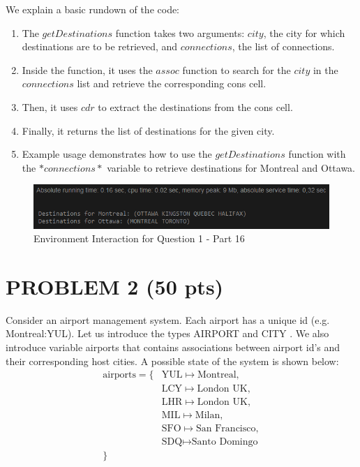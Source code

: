 \documentclass[12pt]{article}
\begin{document}
\begin{spacing}{1.5}
\begin{enumerate}
		      
		      
		      We explain a basic rundown of the code:
		      \begin{enumerate}
		      	\item The $getDestinations$ function takes two arguments: $city$, the city for which destinations are to be retrieved, and $connections$, the list of connections.
		      	\item Inside the function, it uses the $assoc$ function to search for the $city$ in the $connections$ list and retrieve the corresponding cons cell.
		      	\item Then, it uses $cdr$ to extract the destinations from the cons cell.
		      	\item Finally, it returns the list of destinations for the given city.
		      	\item Example usage demonstrates how to use the $getDestinations$ function with the $*connections*$ variable to retrieve destinations for Montreal and Ottawa.
		      \end{enumerate}
		      
		      \begin{figure}[htp]
		      	\centering
		      	\includegraphics[width=1\textwidth]{static/getDestinations-1-16.PNG}
		      	\caption{Environment Interaction for Question 1 - Part 16}
		      	\label{fig:figure}
		      \end{figure}
		      		           
	\end{enumerate}
	
	\section*{PROBLEM 2 (50 pts)}
	
	Consider an airport management system. Each airport has a unique id (e.g. Montreal:YUL).
	Let us introduce the types AIRPORT and CITY . We also introduce variable airports that
	contains associations between airport id's and their corresponding host cities. A possible
	state of the system is shown below:
	\begin{align*}
		\text{airports} = \{
		  & \text{YUL} \mapsto \text{Montreal},      \\
		  & \text{LCY} \mapsto \text{London UK},     \\
		  & \text{LHR} \mapsto \text{London UK},     \\
		  & \text{MIL} \mapsto \text{Milan},         \\
		  & \text{SFO} \mapsto \text{San Francisco}, \\
		  & \text{SDQ} \mapsto \text{Santo Domingo}  \\
		\}
	\end{align*}
	

\end{spacing}
\end{document}

